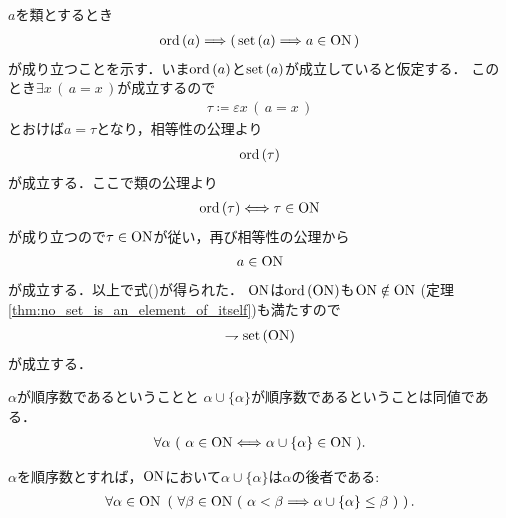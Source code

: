 	\begin{prf}
		$a$を類とするとき
		\begin{align}
			\operatorname*{ord} \left(a\right) \Longrightarrow \left(\, \operatorname*{set} \left(a\right) \Longrightarrow a \in \mathrm{ON}\, \right)
			\label{eq:Burali_Forti_1}
		\end{align}
		が成り立つことを示す．いま$\operatorname*{ord} \left(a\right)$と$\operatorname*{set} \left(a\right)$が成立していると仮定する．
		このとき$\exists x\, (\, a = x\, )$が成立するので
		\begin{align}
			\tau \coloneqq \varepsilon x\, (\, a = x\, )
		\end{align}
		とおけば$a = \tau$となり，相等性の公理より
		\begin{align}
			\operatorname*{ord} \left(\tau\right)
		\end{align}
		が成立する．ここで類の公理より
		\begin{align}
			\operatorname*{ord} \left(\tau\right) \Longleftrightarrow \tau \in \mathrm{ON}
		\end{align}
		が成り立つので$\tau \in \mathrm{ON}$が従い，再び相等性の公理から
		\begin{align}
			a \in \mathrm{ON}
		\end{align}
		が成立する．以上で式()が得られた．
		$\mathrm{ON}$は$\operatorname*{ord} \left(\mathrm{ON}\right)$も$\mathrm{ON} \notin \mathrm{ON}$
		(定理\ref{thm:no_set_is_an_element_of_itself})も満たすので
		\begin{align}
			\rightharpoondown \operatorname*{set} \left(\mathrm{ON}\right)
		\end{align}
		が成立する．
		\QED
	\end{prf}
	
	\begin{screen}
		\begin{thm}[順序数は自分自身との合併が後者となる]\label{thm:latter_element_is_ordinal}
			$\alpha$が順序数であるということと $\alpha \cup \{\alpha\}$が順序数であるということは同値である．
			\begin{align}
				\forall \alpha\ (\ \alpha \in \mathrm{ON} \Longleftrightarrow \alpha \cup \{\alpha\} \in \mathrm{ON}\ ).
			\end{align}
		\end{thm}
	\end{screen}
	
	\begin{screen}
		\begin{thm}[順序数は自分自身との合併が後者となる]
			$\alpha$を順序数とすれば，$\mathrm{ON}$において$\alpha \cup \{\alpha\}$は$\alpha$の後者である:
			\begin{align}
				\forall \alpha \in \ON\ 
				\left(\ \forall \beta \in \ON\ (\ \alpha < \beta 
				\Longrightarrow \alpha \cup \{\alpha\} \leq \beta\ )
				\ \right).
			\end{align}
		\end{thm}
	\end{screen}
